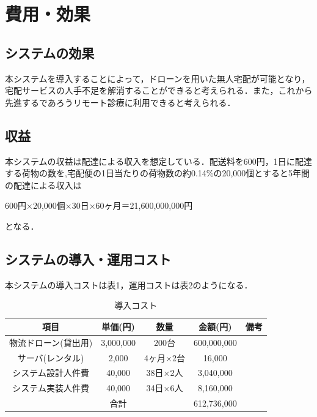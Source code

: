 \documentclass[a4paper, titlepage]{jsarticle}
\begin{document}
\section{費用・効果}
\subsection{システムの効果}
本システムを導入することによって，ドローンを用いた無人宅配が可能となり，宅配サービスの人手不足を解消することができると考えられる．また，これから先進するであろうリモート診療に利用できると考えられる．

\subsection{収益}
本システムの収益は配達による収入を想定している．配送料を600円，1日に配達する荷物の数を,宅配便の1日当たりの荷物数の約0.14\%の20,000個とすると5年間の配達による収入は
\begin{center}
    600円×20,000個×30日×60ヶ月＝21,600,000,000円
\end{center}
となる．

\subsection{システムの導入・運用コスト}
本システムの導入コストは表1，運用コストは表2のようになる．
\begin{table}[htbp]
    \centering
    \begin{tabular}{c c c c c}
    \hline
    項目 & 単価(円) & 数量 & 金額(円) & 備考 \\
    \hline \hline
    物流ドローン(貸出用) & 3,000,000 & 200台 & 600,000,000 &  \\
    サーバ(レンタル) & 2,000 & 4ヶ月×2台 & 16,000 & \\
    システム設計人件費 & 40,000 & 38日×2人 & 3,040,000 & \\
    システム実装人件費 & 40,000 & 34日×6人 & 8,160,000 & \\
    \hline \hline
     & 合計 &  & 612,736,000 &  \\
    \hline
    \end{tabular}
    \caption{導入コスト}
    \label{tab:label1}
\end{table}
\end{document}
